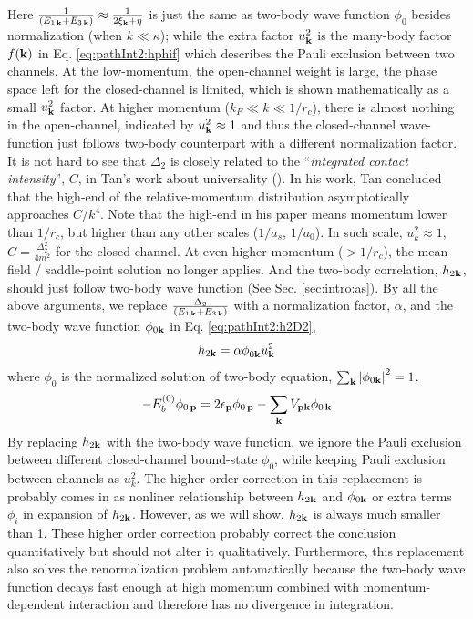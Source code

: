 Here $\frac{1}{(E_{1\,\mathbf{k}}+E_{3\,\mathbf{k}})}\approx\frac{1}{2\xi_{\mathbf{k}}+\eta}$ is just the same as two-body wave function $\phi_{0}$  besides normalization (when $k\ll\kappa$); while the extra factor $u_{\mathbf{k}}^{2}$ is the many-body factor $f(\mathbf{k})$ in Eq. \ref{eq:pathInt2:hphif} which describes the Pauli exclusion between two channels.  At the low-momentum, the open-channel weight is large, the phase space left for the closed-channel is limited, which is shown mathematically as a small $u_{\mathbf{k}}^{2}$ factor.   At higher momentum ($k_{F}\ll{k}\ll1/r_{c}$),  there is almost nothing in the open-channel,  indicated by $u_{\mathbf{k}}^{2}\approx1$ and thus the closed-channel wave-function just follows two-body counterpart with a different normalization factor.   It is not hard to see that $\Delta_{2}$ is closely related to the ``\emph{integrated contact intensity}'', $C$, in Tan's work about universality (\cite{Tan2008-1,Tan2008-2}).  In his work, Tan concluded that  the high-end of the relative-momentum distribution asymptotically approaches  $C/k^{4}$.  Note that the high-end in his paper means momentum lower than $1/r_{c}$, but higher than any other scales ($1/a_{s}$, $1/a_{0}$).  In such scale, $u_{k}^2\approx1$, %
$C=\frac{\Delta_{2}^{2}}{4m^{2}}$ for the closed-channel.   
At even higher momentum ($>1/r_{c}$), the mean-field / saddle-point solution no longer applies.  And the two-body correlation, $h_{2\mathbf{k}}$, should just follow two-body wave function (See Sec. \ref{sec:intro:as}).  By all the above arguments, we replace $\frac{\Delta_{2}}{(E_{1\,\mathbf{k}}+E_{3\,\mathbf{k}})}$ with a normalization factor, $\alpha$, and the two-body wave function $\phi_{0\mathbf{k}}$ in Eq. \ref{eq:pathInt2:h2D2},
\begin{equation}\label{eq:pathInt2:hphi}
h_{2\mathbf{k}}=\alpha\phi^{}_{0\mathbf{k}}u_{\mathbf{k}}^{2}
\end{equation}
where $\phi_{0}$ is the normalized  solution of  two-body \sch equation, $\sum_{\mathbf{k}}\left\lvert{\phi_{0\ensuremath{\mathbf{k}}}}\right\rvert^{2}=1$.
\begin{equation}\label{eq:pathInt2:phi}
-E_{b}^{(0)}\phi_{0\,\mathbf{p}}=2\epsilon_{\mathbf{p}}\phi_{0\,\mathbf{p}}-\sum_{\mathbf{k}}V_{\mathbf{p}\mathbf{k}} \phi_{0\,\mathbf{k}}
\end{equation}
By replacing $h_{2\mathbf{k}}$ with the two-body wave function, we ignore the Pauli exclusion between different closed-channel bound-state $\phi_{0}$, while keeping Pauli exclusion between channels as $u_{k}^{2}$.  The higher order correction in this replacement is probably comes in as nonliner relationship between $h_{2\mathbf{k}}$ and $\phi_{0\mathbf{k}}$ or extra terms $\phi_{i}$ in expansion of $h_{2\mathbf{k}}$. However, as we will show, $h_{2\mathbf{k}}$ is always  much smaller than 1. These higher order correction probably correct the conclusion quantitatively but should not alter it qualitatively. 
Furthermore, this replacement also solves the renormalization problem automatically because the two-body wave function decays fast enough at high momentum combined with momentum-dependent interaction and therefore has no divergence in integration.  

